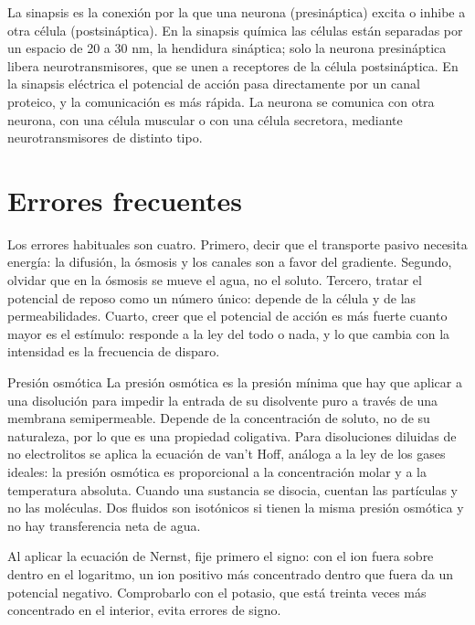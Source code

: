 \documentclass{book}
\begin{document}
La sinapsis es la conexión por la que una neurona (presináptica) excita o inhibe a otra célula (postsináptica). En la sinapsis química las células están separadas por un espacio de 20 a 30 nm, la hendidura sináptica; solo la neurona presináptica libera neurotransmisores, que se unen a receptores de la célula postsináptica. En la sinapsis eléctrica el potencial de acción pasa directamente por un canal proteico, y la comunicación es más rápida. La neurona se comunica con otra neurona, con una célula muscular o con una célula secretora, mediante neurotransmisores de distinto tipo.


\section{Errores frecuentes}

Los errores habituales son cuatro. Primero, decir que el transporte pasivo necesita energía: la difusión, la ósmosis y los canales son a favor del gradiente. Segundo, olvidar que en la ósmosis se mueve el agua, no el soluto. Tercero, tratar el potencial de reposo como un número único: depende de la célula y de las permeabilidades. Cuarto, creer que el potencial de acción es más fuerte cuanto mayor es el estímulo: responde a la ley del todo o nada, y lo que cambia con la intensidad es la frecuencia de disparo.


\begin{tcolorbox}[title={Consejo}, studiumtip, breakable]

Presión osmótica
La presión osmótica es la presión mínima que hay que aplicar a una disolución para impedir la entrada de su disolvente puro a través de una membrana semipermeable. Depende de la concentración de soluto, no de su naturaleza, por lo que es una propiedad coligativa. Para disoluciones diluidas de no electrolitos se aplica la ecuación de van't Hoff, análoga a la ley de los gases ideales: la presión osmótica es proporcional a la concentración molar y a la temperatura absoluta. Cuando una sustancia se disocia, cuentan las partículas y no las moléculas. Dos fluidos son isotónicos si tienen la misma presión osmótica y no hay transferencia neta de agua.


Al aplicar la ecuación de Nernst, fije primero el signo: con el ion fuera sobre dentro en el logaritmo, un ion positivo más concentrado dentro que fuera da un potencial negativo. Comprobarlo con el potasio, que está treinta veces más concentrado en el interior, evita errores de signo.

\end{tcolorbox}
\end{document}
